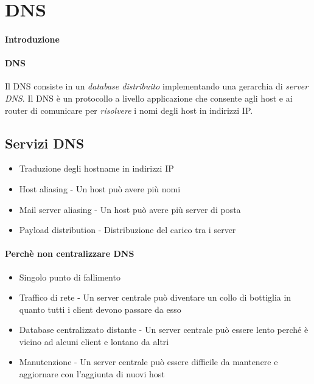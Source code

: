 \section[Domain Name System (\texttt{DNS})]{\acrfull*{DNS}}
    \paragraph{Introduzione}
        \paragraph{\acrlong*{DNS}} Il \Acrfull*{DNS} consiste in un \textit{database distribuito} implementando una gerarchia di \textit{server \Acrshort*{DNS}}. Il \Acrshort*{DNS} è un protocollo a livello applicazione che consente agli host e ai router di comunicare per \textit{risolvere} i nomi degli host in indirizzi \Acrshort*{IP}.
    \subsection[Servizi \texttt{DNS}]{Servizi \Acrshort*{DNS}}
        \begin{itemize}
            \item Traduzione degli hostname in indirizzi IP
            \item Host aliasing - Un host può avere più nomi
            \item Mail server aliasing - Un host può avere più server di posta
            \item Payload distribution - Distribuzione del carico tra i server
        \end{itemize}
        \paragraph{Perchè non centralizzare \Acrshort*{DNS}}
        \begin{itemize}
            \item Singolo punto di fallimento 
            \item Traffico di rete - Un server centrale può diventare un collo di bottiglia in quanto tutti i client devono passare da esso
            \item Database centralizzato distante - Un server centrale può essere lento perché è vicino ad alcuni client e lontano da altri
            \item Manutenzione - Un server centrale può essere difficile da mantenere e aggiornare con l'aggiunta di nuovi host
        \end{itemize}
